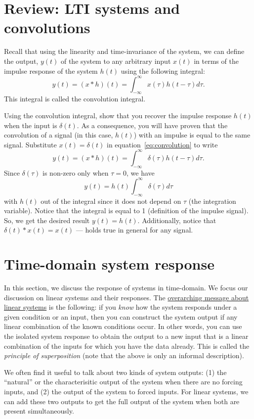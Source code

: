 
\section{Review: LTI systems and convolutions}
Recall that using the linearity and time-invariance of the system, we can define the output, $y(t)$ of the system to any arbitrary input $x(t)$ in terms of the impulse response of the system $h(t)$ using the following integral:
\begin{equation}
y(t) = (x * h)(t) = \int_{-\infty}^{\infty} x(\tau) h(t - \tau) d\tau.
\label{eq:convolution}
\end{equation}
This integral is called the convolution integral. 
\begin{popquiz}
Using the convolution integral, show that you recover the impulse response $h(t)$ when the input is $\delta(t)$. As a consequence, you will have proven that the convolution of a signal (in this case, $h(t)$) with an impulse is equal to the same signal. 
\popqsplit
Substitute $x(t) = \delta(t)$ in equation~\eqref{eq:convolution} to write
\[
y(t) = (x * h)(t) = \int_{-\infty}^{\infty} \delta(\tau) h(t - \tau) d\tau.
\]
Since $\delta(\tau)$ is non-zero only when $\tau = 0$, we have 
\[
y(t) = h(t)\int_{-\infty}^{\infty} \delta(\tau) d\tau
\]
with $h(t)$ out of the integral since it does not depend on $\tau$ (the integration variable). Notice that the integral is equal to 1 (definition of the impulse signal). So, we get the desired result $y(t) = h(t)$. Additionally, notice that $\delta(t) * x(t) = x(t)$ --- holds true in general for any signal.
\end{popquiz}

\section{Time-domain system response}
In this section, we discuss the response of systems in time-domain. We focus our discussion on linear systems and their responses. The \ul{overarching message about linear systems} is the following: if you \emph{know} how the system responds under a given condition or an input, then you can construct the system output if any linear combination of the known conditions occur. In other words, you can use the isolated system response to obtain the output to a new input that is a linear combination of the inputs for which you have the data already. This is called the \emph{principle of superposition} (note that the above is only an informal description). 

We often find it useful to talk about two kinds of system outputs: (1) the ``natural'' or the characterisitic output of the system when there are no forcing inputs, and (2) the output of the system to forced inputs. For linear systems, we can add these two outputs to get the full output of the system when both are present simultaneously.

